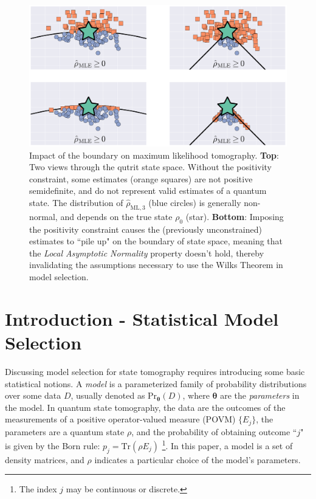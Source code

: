 \documentclass[aps,pra, twocolumn]{revtex4-1}
\newcommand{\bs}[1]{\boldsymbol{#1}}
\newcommand{\rhohat}{\hat{\rho}}
\newcommand{\rhoML}[1]{\rhohat_{\scriptscriptstyle{\mathrm{ML},#1}}}
\begin{document}
\begin{figure}[h]
\includegraphics[width=\columnwidth]{Images/Figure_1.pdf}
 \caption{Impact of the boundary on maximum likelihood tomography. \textbf{Top}: Two views through the qutrit state space. Without the positivity constraint, some estimates (orange squares) are not positive semidefinite, and do not represent valid estimates of a quantum state. The distribution of $\rhoML{3}$ (blue circles) is generally non-normal, and depends on the true state $\rho_{0}$ (star).
\textbf{Bottom}:  Imposing the positivity constraint causes the (previously unconstrained) estimates to ``pile up" on the boundary of state space, meaning that the \emph{Local Asymptotic Normality} property doesn't hold, thereby invalidating the assumptions necessary to use the Wilks Theorem in model selection.}
\label{fig:boundaries}
\end{figure}

\section{Introduction - Statistical Model Selection}

Discussing model selection for state tomography requires introducing some basic statistical notions.  A \emph{model} is a parameterized family of probability distributions over some data $D$, usually denoted as $\mathrm{Pr}_{\bs{\theta}}(D)$, where $\bs{\theta}$ are the \emph{parameters} in the model. In quantum state tomography, the data are the outcomes of the measurements of a positive operator-valued measure (POVM) $\{E_{j}\}$, the parameters are a quantum state $\rho$, and the probability of obtaining outcome ``$j$" is given by the Born rule: $p_{j} = \mathrm{Tr}(\rho E_{j})$ \footnote{The index $j$ may be continuous or discrete.}. In this paper, a model is a set of density matrices, and $\rho$ indicates a particular choice of the model's parameters.
\end{document}
